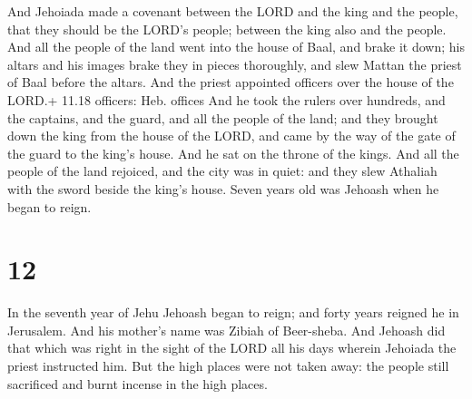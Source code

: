  And Jehoiada made a covenant between the LORD and the
king and the people, that they should be the LORD's people; between the
king also and the people.  And all the people of the land
went into the house of Baal, and brake it down; his altars and his
images brake they in pieces thoroughly, and slew Mattan the priest of
Baal before the altars. And the priest appointed officers over the house
of the LORD.+ 11.18 officers: Heb. offices  And he took the
rulers over hundreds, and the captains, and the guard, and all the
people of the land; and they brought down the king from the house of the
LORD, and came by the way of the gate of the guard to the king's house.
And he sat on the throne of the kings.  And all the people
of the land rejoiced, and the city was in quiet: and they slew Athaliah
with the sword beside the king's house.  Seven years old
was Jehoash when he began to reign.

\hypertarget{section-11}{%
\section{12}\label{section-11}}

 In the seventh year of Jehu Jehoash began to reign; and
forty years reigned he in Jerusalem. And his mother's name was Zibiah of
Beer-sheba.  And Jehoash did that which was right in the
sight of the LORD all his days wherein Jehoiada the priest instructed
him.  But the high places were not taken away: the people
still sacrificed and burnt incense in the high places.

